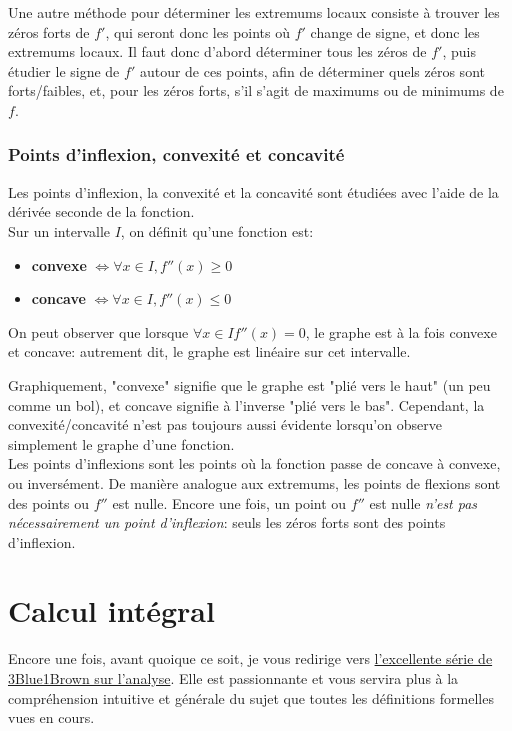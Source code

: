 \documentclass{article}
\begin{document}
Une autre méthode pour déterminer les extremums locaux consiste à trouver les zéros forts de \(f'\), qui seront donc les points où \(f'\) change de signe, et donc les extremums locaux. Il faut donc d'abord déterminer tous les zéros de \(f'\), puis étudier le signe de \(f'\) autour de ces points, afin de déterminer quels zéros sont forts/faibles, et, pour les zéros forts, s'il s'agit de maximums ou de minimums de \(f\).

\subsubsection{Points d'inflexion, convexité et concavité}
Les points d'inflexion, la convexité et la concavité sont étudiées avec l'aide de la dérivée seconde de la fonction. \\

Sur un intervalle \(I\), on définit qu'une fonction est:
\begin{itemize}
	\item \textbf{convexe} \( \iff \forall x \in I, f''(x) \geq 0\)
	\item \textbf{concave} \( \iff \forall x \in I, f''(x) \leq 0\)
\end{itemize}
On peut observer que lorsque \(\forall x \in I f''(x) = 0\), le graphe est à la fois convexe et concave: autrement dit, le graphe est linéaire sur cet intervalle.

Graphiquement, "convexe" signifie que le graphe est "plié vers le haut" (un peu comme un bol), et concave signifie à l'inverse "plié vers le bas". Cependant, la convexité/concavité n'est pas toujours aussi évidente lorsqu'on observe simplement le graphe d'une fonction. \\

Les points d'inflexions sont les points où la fonction passe de concave à convexe, ou inversément. De manière analogue aux extremums, les points de flexions sont des points ou \(f''\) est nulle. Encore une fois, un point ou \(f''\) est nulle \emph{n'est pas nécessairement un point d'inflexion}: seuls les zéros forts sont des points d'inflexion.


\section{Calcul intégral}
Encore une fois, avant quoique ce soit, je vous redirige vers \href{https://www.youtube.com/playlist?list=PLZHQObOWTQDMsr9K-rj53DwVRMYO3t5Yr}{l'excellente série de 3Blue1Brown sur l'analyse}. Elle est passionnante et vous servira plus à la compréhension intuitive et générale du sujet que toutes les définitions formelles vues en cours. 
\end{document}

